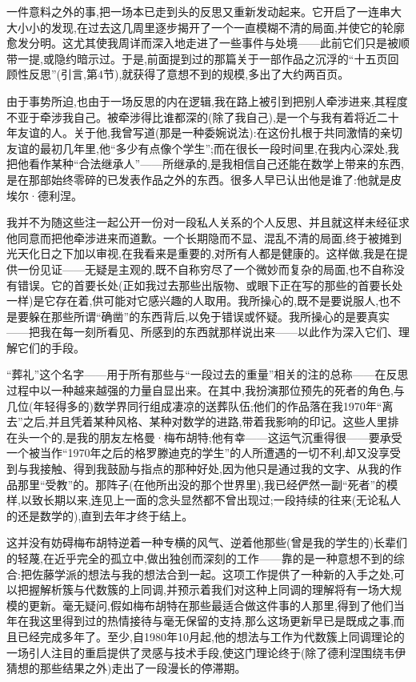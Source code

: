  一件意料之外的事,把一场本已走到头的反思又重新发动起来。它开启了一连串大大小小的发现,在过去这几周里逐步揭开了一个一直模糊不清的局面,并使它的轮廓愈发分明。这尤其使我周详而深入地走进了一些事件与处境——此前它们只是被顺带一提,或隐约暗示过。于是,前面提到过的那篇关于一部作品之沉浮的“十五页回顾性反思”(引言,第4节),就获得了意想不到的规模,多出了大约两百页。

由于事势所迫,也由于一场反思的内在逻辑,我在路上被引到把别人牵涉进来,其程度不亚于牵涉我自己。被牵涉得比谁都深的(除了我自己),是一个与我有着将近二十年友谊的人。关于他,我曾写道(那是一种委婉说法):在这份扎根于共同激情的亲切友谊的最初几年里,他“多少有点像个学生”;而在很长一段时间里,在我内心深处,我把他看作某种“合法继承人”——所继承的,是我相信自己还能在数学上带来的东西,是在那部始终零碎的已发表作品之外的东西。很多人早已认出他是谁了:他就是皮埃尔·德利涅。

我并不为随这些注一起公开一份对一段私人关系的个人反思、并且就这样未经征求他同意而把他牵涉进来而道歉。一个长期隐而不显、混乱不清的局面,终于被摊到光天化日之下加以审视,在我看来是重要的,对所有人都是健康的。这样做,我是在提供一份见证——无疑是主观的,既不自称穷尽了一个微妙而复杂的局面,也不自称没有错误。它的首要长处(正如我过去那些出版物、或眼下正在写的那些的首要长处一样)是它存在着,供可能对它感兴趣的人取用。我所操心的,既不是要说服人,也不是要躲在那些所谓“确凿”的东西背后,以免于错误或怀疑。我所操心的是要真实——把我在每一刻所看见、所感到的东西就那样说出来——以此作为深入它们、理解它们的手段。

“葬礼”这个名字——用于所有那些与“一段过去的重量”相关的注的总称——在反思过程中以一种越来越强的力量自显出来。在其中,我扮演那位预先的死者的角色,与几位(年轻得多的)数学界同行组成凄凉的送葬队伍;他们的作品落在我1970年“离去”之后,并且凭着某种风格、某种对数学的进路,带着我影响的印记。这些人里排在头一个的,是我的朋友左格曼·梅布胡特;他有幸——这运气沉重得很——要承受一个被当作“1970年之后的格罗滕迪克的学生”的人所遭遇的一切不利,却又没享受到与我接触、得到我鼓励与指点的那种好处,因为他只是通过我的文字、从我的作品那里“受教”的。那阵子(在他所出没的那个世界里),我已经俨然一副“死者”的模样,以致长期以来,连见上一面的念头显然都不曾出现过;一段持续的往来(无论私人的还是数学的),直到去年才终于结上。

 这并没有妨碍梅布胡特逆着一种专横的风气、逆着他那些(曾是我的学生的)长辈们的轻蔑,在近乎完全的孤立中,做出独创而深刻的工作——靠的是一种意想不到的综合:把佐藤学派的想法与我的想法合到一起。这项工作提供了一种新的入手之处,可以把握解析簇与代数簇的上同调,并预示着我们对这种上同调的理解将有一场大规模的更新。毫无疑问,假如梅布胡特在那些最适合做这件事的人那里,得到了他们当年在我这里得到过的热情接待与毫无保留的支持,那么这场更新早已是既成之事,而且已经完成多年了。至少,自1980年10月起,他的想法与工作为代数簇上同调理论的一场引人注目的重启提供了灵感与技术手段,使这门理论终于(除了德利涅围绕韦伊猜想的那些结果之外)走出了一段漫长的停滞期。

